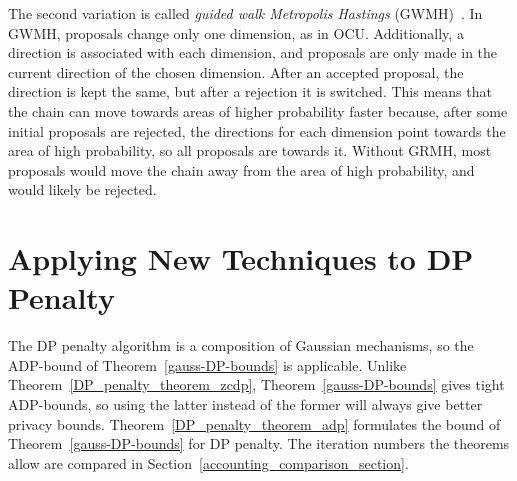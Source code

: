 \documentclass[english,twoside,openright]{HYgraduMLDS}
\begin{document}
The second variation is called \emph{guided walk Metropolis Hastings}
(GWMH)~\cite{YildirimE19}.
In GWMH, proposals change only one dimension, as in OCU. Additionally, a direction
is associated with each dimension, and proposals are only made in the current
direction of the chosen dimension. After an accepted proposal, the direction is
kept the same, but after a rejection it is switched. This means that the chain can
move towards areas of higher probability faster because, after some initial
proposals are rejected, the directions for each dimension point towards the
area of high probability, so all proposals are towards it. Without GRMH, most
proposals would move the chain away from the area of high probability, and
would likely be rejected.

\section{Applying New Techniques to DP Penalty}\label{dp_penalty_adp_section}

The DP penalty algorithm is a composition of Gaussian mechanisms, so
the ADP-bound of Theorem~\ref{gauss-DP-bounds} is applicable. Unlike
Theorem~\ref{DP_penalty_theorem_zcdp}, Theorem~\ref{gauss-DP-bounds}
gives tight ADP-bounds, so using the latter instead of the former will
always give better privacy bounds. Theorem~\ref{DP_penalty_theorem_adp}
formulates the bound of Theorem~\ref{gauss-DP-bounds} for DP penalty.
The iteration numbers the theorems allow are compared in
Section~\ref{accounting_comparison_section}.
\end{document}
